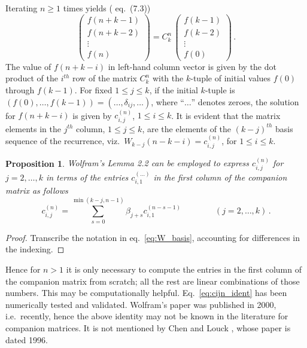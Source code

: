 \documentclass[review]{elsarticle}
\theoremstyle{plain}
\newtheorem{proposition}[theorem]{Proposition}
\begin{document}
Iterating $n\ge1$ times yields (\cite{ChenLouck} eq.~(7.3))
\begin{equation}
\begin{pmatrix} f(n+k-1) \\ f(n+k-2) \\ \vdots \\ f(n) \end{pmatrix} = C_k^n\,
\begin{pmatrix} f(k-1) \\ f(k-2) \\ \vdots \\ f(0) \end{pmatrix} \,.
\end{equation}
The value of $f(n+k-i)$ in left-hand column vector
is given by the dot product of the $i^{th}$ row of the matrix $C_k^n$ with the $k$-tuple of initial values $f(0)$ through $f(k-1)$.
For fixed $1 \le j \le k$,
if the initial $k$-tuple is $(f(0),\dots,f(k-1))=(\dots,\delta_{ij},\dots)$, where ``$\dots$'' denotes zeroes,
the solution for $f(n+k-i)$ is given by $c_{i,j}^{(n)}$, $1 \le i \le k$.
It is evident that the matrix elements in the $j^{th}$ column, $1 \le j \le k$,
are the elements of the $(k-j)^{th}$ basis sequence of the recurrence, viz.~$W_{k-j}(n-k-i)=c_{i,j}^{(n)}$, for $1 \le i \le k$.
\begin{proposition}
\label{thm:ident_cmpmtx}  
  Wolfram's Lemma 2.2 \cite{Wolfram2000}
  can be employed to express $c_{i,j}^{(n)}$ for $j=2,\dots,k$ in terms of the entries $c_{i,1}^{(\dots)}$
  in the first column of the companion matrix as follows
\begin{equation}
\label{eq:cijn_ident}  
c_{i,j}^{(n)} = \sum_{s=0}^{\min(k-j,n-1)} \beta_{j+s} c_{i,1}^{(n-s-1)} \qquad\qquad (j=2,\dots,k) \,.
\end{equation}
\end{proposition}
\begin{proof}
Transcribe the notation in eq.~\eqref{eq:W_basis}, accounting for differences in the indexing.
\end{proof}
Hence for $n>1$ it is only necessary to compute the entries in the first column of the companion matrix from scratch;
all the rest are linear combinations of those numbers.
This may be computationally helpful.
Eq.~\eqref{eq:cijn_ident} has been numerically tested and validated.
Wolfram's paper \cite{Wolfram2000} was published in 2000, i.e.~recently,
hence the above identity may not be known in the literature for companion matrices.
It is not mentioned by Chen and Louck \cite{ChenLouck}, whose paper is dated 1996.
\end{document}
